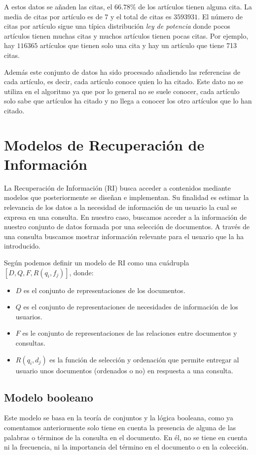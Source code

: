 \documentclass[size=a4, parskip=half, titlepage=false, toc=flat, toc=bib, 12pt, twoside]{scrartcl}
\theoremstyle{theorem-style}
\theoremstyle{definition-style}
\theoremstyle{remark-style}
\theoremstyle{example-style}
\theoremstyle{definition-style}
\theoremstyle{remark-style}
\begin{document}
A estos datos se añaden las citas, el $66.78 \%$ de los artículos tienen alguna cita. La media de citas por artículo es de 7 y el total de citas es $3593931$. El número de citas por artículo sigue una típica distribución \textit{ley de potencia} donde pocos artículos tienen muchas citas y muchos artículos tienen pocas citas. Por ejemplo, hay $116365$ artículos que tienen solo una cita y hay un artículo que tiene 713 citas.

Además este conjunto de datos ha sido procesado añadiendo las referencias de cada artículo, es decir, cada artículo conoce quien lo ha citado. Este dato no se utiliza en el algoritmo ya que por lo general no se suele conocer, cada artículo solo sabe que artículos ha citado y no llega a conocer los otro artículos que lo han citado.

\newpage

\section{Modelos de Recuperación de Información}
La Recuperación de Información (RI) busca acceder a contenidos mediante modelos que posteriormente se diseñan e implementan. Su finalidad es estimar la relevancia de los datos a la necesidad de información de un usuario la cual se expresa en una consulta.
En nuestro caso, buscamos acceder a la información de nuestro conjunto de datos formada por una selección de documentos. A través de una consulta buscamos mostrar información relevante para el usuario que la ha introducido.

Según \cite{ri} podemos definir un modelo de RI como una cuádrupla $[D,Q,F,R(q_i,f_j)]$, donde:
\begin{itemize}
\item $D$ es el conjunto de representaciones de los documentos.
\item $Q$ es el conjunto de representaciones de necesidades de información de los usuarios.
\item $F$ es le conjunto de representaciones de las relaciones entre documentos y consultas.
\item $R(q_i,d_j)$ es la función de selección y ordenación que permite entregar al usuario unos documentos (ordenados o no) en respuesta a una consulta.
\end{itemize}

\subsection{Modelo booleano}
Este modelo se basa en la teoría de conjuntos y la lógica booleana, como ya comentamos anteriormente solo tiene en cuenta la presencia de alguna de las palabras o términos de la consulta en el documento. En él, no se tiene en cuenta ni la frecuencia, ni la importancia del término en el documento o en la colección.
\end{document}
